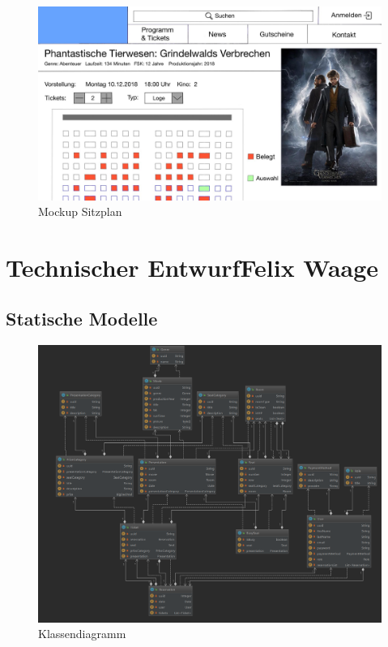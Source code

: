 		\begin{figure}[H]
			\centering 
			\includegraphics[width=14cm]{img/mockUp3.png}
			\captionsetup{format=hang}
			\caption[Mockup Sitzplan]{\label{fig:mockUpSitzplan} Mockup Sitzplan }
		\end{figure}
	
	\section[Technischer Entwurf]{Technischer Entwurf{\hfill \normalsize Felix Waage}} 	
		\subsection{Statische Modelle}
			\begin{figure}[H]
				\centering 
				\includegraphics[width=14cm]{img/klassendiagramm.png}
				\captionsetup{format=hang}
				\caption[Klassendiagramm]{\label{fig:klassendiagramm} Klassendiagramm }
			\end{figure}
		
